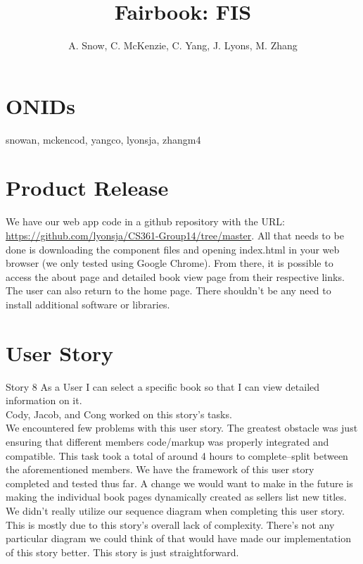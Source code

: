 \documentclass[12pt]{article}
\title{Fairbook: FIS}
\author{A. Snow, C. McKenzie, C. Yang, J. Lyons, M. Zhang}
\begin{document}
	\maketitle


	\tableofcontents
	\section{ONIDs}
		snowan, mckencod, yangco, lyonsja, zhangm4



	\section{Product Release}
	We have our web app code in a github repository with the URL: \url{https://github.com/lyonsja/CS361-Group14/tree/master}.
	All that needs to be done is downloading the component files and opening index.html in your web browser (we only tested using Google Chrome). 
	From there, it is possible to access the about page and detailed book view page from their respective links. 
	The user can also return to the home page. 
	There shouldn’t be any need to install additional software or libraries.


	\section{User Story}
	Story 8 As a User I can select a specific book so that I can view detailed information on it. \\
	Cody, Jacob, and Cong worked on this story’s tasks. \\
	We encountered few problems with this user story. The greatest obstacle was just ensuring that different members code/markup was properly integrated and compatible. This task took a total of around 4 hours to complete--split between the aforementioned members. We have the framework of this user story completed and tested thus far. A change we would want to make in the future is making the individual book pages dynamically created as sellers list new titles. \\
	We didn’t really utilize our sequence diagram when completing this user story. This is mostly due to this story’s overall lack of complexity. There’s not any particular diagram we could think of that would have made our implementation of this story better. This story is just straightforward.
\end{document}
